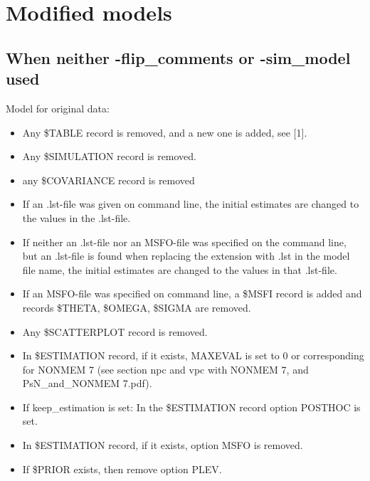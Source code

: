 \section{Modified models}

\subsection{When neither -flip\_comments or -sim\_model used}
Model for original data:  
\begin{itemize}
	\item Any \$TABLE record is removed, and a new one is added, see [1].
	\item Any \$SIMULATION record is removed.
	\item any \$COVARIANCE record is removed
	\item If an .lst-file was given on command line, the initial estimates are changed to the values in the .lst-file. 
	\item If neither an .lst-file nor an MSFO-file was specified on the command line, but an .lst-file is found when replacing the extension with .lst in the model file name, the initial estimates are changed to the values in that .lst-file.
	\item If an MSFO-file was specified on command line, a \$MSFI record is added and records \$THETA, \$OMEGA, \$SIGMA are removed.  
	\item Any \$SCATTERPLOT record is removed.
	\item In \$ESTIMATION record, if it exists, MAXEVAL is set to 0 or corresponding for  NONMEM 7 (see section npc and vpc with NONMEM 7, and PsN\_and\_NONMEM 7.pdf). 
	\item If keep\_estimation is set: In the \$ESTIMATION record option POSTHOC is set.
	\item In \$ESTIMATION record, if it exists, option MSFO is removed.
	\item If \$PRIOR exists, then remove option PLEV.
\end{itemize}


